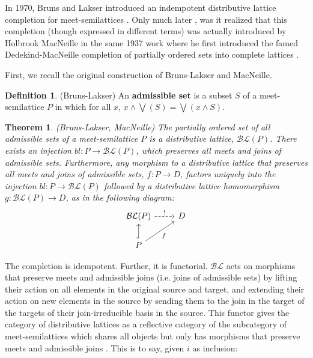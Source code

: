 \documentclass[hoptionsi,review,screen,format=acmsmall]{acmart}
\newtheorem{theorem}{Theorem}[section]
\theoremstyle{definition}
\newtheorem{definition}{Definition}[section]
\newcommand{\BLc}{\mathcal{BL}}
\begin{document}
In 1970, Bruns and Lakser introduced an indempotent distributive lattice completion for meet-semilattices \cite{bruns1970injective}. Only much later \cite{ball2016dedekind}, was it realized that this completion (though expressed in different terms) was actually introduced by  Holbrook MacNeille in the same 1937 work where he first introduced the famed Dedekind-MacNeille completion of partially ordered sets into complete lattices \cite{macneille1937partially}. 

First, we recall the original construction of Bruns-Lakser and MacNeille.

\begin{definition}
(Bruns-Lakser) An \textbf{admissible set} is a subset \(S\) of a meet-semilattice \(P\) in which for all \(x\), \(x \wedge \bigvee(S) = \bigvee(x \wedge S)\).
\end{definition}

\begin{theorem}
(Bruns-Lakser, MacNeille) The partially ordered set of all admissible sets of a meet-semilattice \(P\) is a distributive lattice, \(\BLc(P)\). There exists an injection \(bl : P \rightarrow \BLc(P)\), which preserves all meets and joins of admissible sets. Furthermore, any morphism to a distributive lattice that preserves all meets and joins of admissible sets, \(f : P \rightarrow D\), factors uniquely into the injection \(bl : P \rightarrow \BLc(P)\) followed by a distributive lattice homomorphism \(g : \BLc(P) \rightarrow D\), as in the following diagram:
\begin{equation*}
\begin{tikzcd}
\BLc(P) \arrow[r, "!",dashed]            & D \\
P \arrow[u, hook] \arrow[ru, "f"'] &
\end{tikzcd}
\end{equation*}

\end{theorem}

The completion is idempotent. Further, it is functorial. \(\BLc\) acts on morphisms that preserve meets and admissible joins (i.e. joins of admissible sets) by lifting their action on all elements in the original source and target, and extending their action on new elements in the source by sending them to the join in the target of the targets of their join-irreducible basis in the source. This functor gives the category of distributive lattices as a reflective category of the subcategory of meet-semilattices which shares all objects but only has morphisms that preserve meets and admissible joins \cite{gehrke2014distributive}. This is to say, given \(i\) as inclusion:
\end{document}
